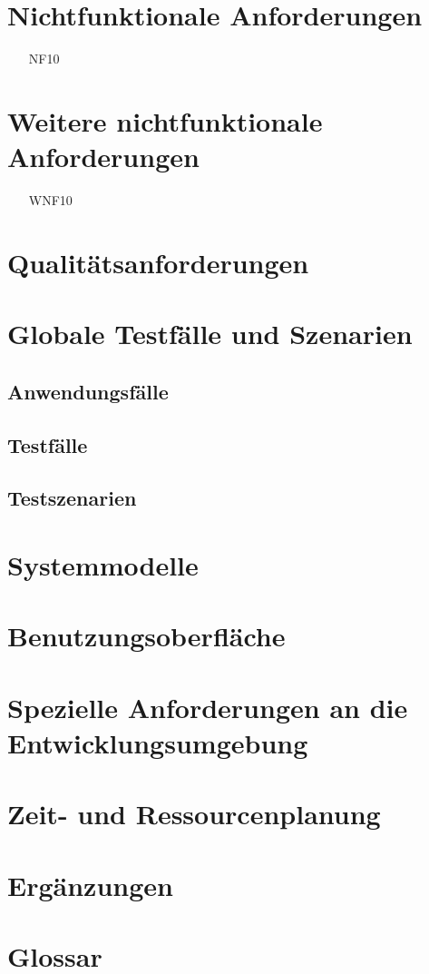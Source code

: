 \documentclass[]{scrbook}
\begin{document}
\section{Nichtfunktionale Anforderungen}
\begin{itemize}[nosep]
\item[NF10] %
\end{itemize}

\section{Weitere nichtfunktionale Anforderungen}
\begin{itemize}
\item[WNF10] %
\end{itemize}

\section{Qualitätsanforderungen}

\section{Globale Testfälle und Szenarien}
\subsection{Anwendungsfälle}
\subsection{Testfälle}
\subsection{Testszenarien}

\section{Systemmodelle}

\section{Benutzungsoberfläche}

\section{Spezielle Anforderungen an die Entwicklungsumgebung}

\section{Zeit- und Ressourcenplanung}

\section{Ergänzungen}

\section{Glossar}
\end{document}
